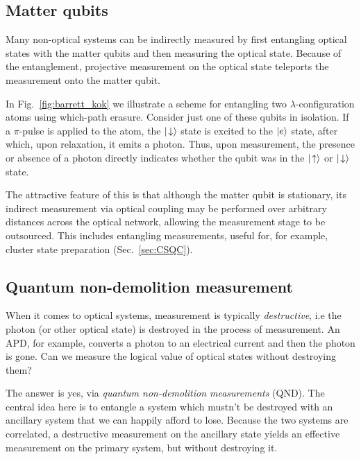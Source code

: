 
%
%

\subsection{Matter qubits} 

Many non-optical systems can be indirectly measured by first entangling optical states with the matter qubits and then measuring the optical state. Because of the entanglement, projective measurement on the optical state teleports the measurement onto the matter qubit.

In Fig.~\ref{fig:barrett_kok} we illustrate a scheme for entangling two $\lambda$-configuration atoms using which-path erasure. Consider just one of these qubits in isolation. If a $\pi$-pulse is applied to the atom, the $|\!\downarrow\rangle$ state is excited to the $|e\rangle$ state, after which, upon relaxation, it emits a photon. Thus, upon measurement, the presence or absence of a photon directly indicates whether the qubit was in the $|\!\uparrow\rangle$ or $|\!\downarrow\rangle$ state.

The attractive feature of this is that although the matter qubit is stationary, its indirect measurement via optical coupling may be performed over arbitrary distances across the optical network, allowing the measurement stage to be outsourced. This includes entangling measurements, useful for, for example, cluster state preparation (Sec.~\ref{sec:CSQC}).

%
%

\subsection{Quantum non-demolition measurement}

When it comes to optical systems, measurement is typically \textit{destructive}, i.e the photon (or other optical state) is destroyed in the process of measurement. An APD, for example, converts a photon to an electrical current and then the photon is gone. Can we measure the logical value of optical states without destroying them?

The answer is yes, via \textit{quantum non-demolition measurements} (QND). The central idea here is to entangle a system which mustn't be destroyed with an ancillary system that we can happily afford to lose. Because the two systems are correlated, a destructive measurement on the ancillary state yields an effective measurement on the primary system, but without destroying it.

